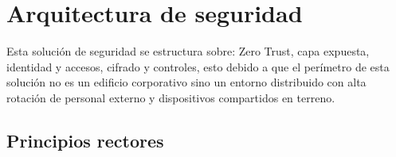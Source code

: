 
\chapter{Arquitectura de seguridad}
\label{sec:i-arquitectura-de-seguridad}

Esta solución de seguridad se estructura sobre: Zero Trust, capa expuesta, identidad y accesos, cifrado y controles, esto debido a que el perímetro de esta solución no es un edificio corporativo sino un entorno distribuido con alta rotación de personal externo y dispositivos compartidos en terreno.

\section{Principios rectores}
\label{sub:1-principios-rectores}


